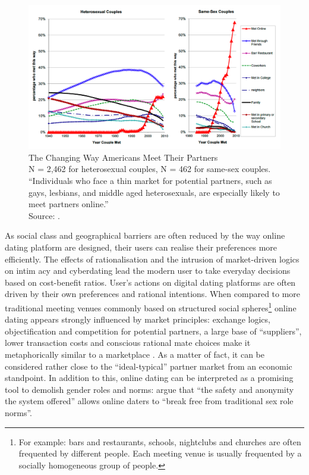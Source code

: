 \begin{figure}[h]
\includegraphics[width=1\columnwidth]{assets/rosenfeld1}

\caption{The Changing Way Americans Meet Their Partners\label{fig:The-Changing-Way}\protect \\
{\footnotesize{}N = 2,462 for heterosexual couples, N = 462 for same-sex
couples.}\protect \\
{\footnotesize{}\textquotedblleft Individuals who face a thin market
for potential partners, such as gays, lesbians, and middle aged heterosexuals,
are especially likely to meet partners online.\textquotedblright }\protect \\
{\footnotesize{}Source: \citet{Michael-J.-Rosenfeld2012Searching-for-a}.}}
\end{figure}

As social class and geographical barriers are often reduced by the
way online dating platform are designed, their users can realise their
preferences more efficiently. The effects of rationalisation and the
intrusion of market-driven logics on intim
acy and cyberdating lead
the modern user to take everyday decisions based on cost-benefit ratios.
User's actions on digital dating platforms are often driven by their
own preferences and rational intentions. When compared to more traditional
meeting venues \textendash{} commonly based on structured social spheres\footnote{For example: bars and restaurants, schools, nightclubs and churches
are often frequented by different people. Each meeting venue is usually
frequented by a socially homogeneous group of people. } \textendash{} online dating appears strongly influenced by market
principles: exchange logics, objectification and competition for potential
partners, a large base of \textquotedblleft suppliers\textquotedblright ,
lower transaction costs and conscious rational mate choices make it
metaphorically similar to a marketplace \citep{Schmitz2016The-Structure-o}.
As a matter of fact, it can be considered rather close to the \textquotedblleft ideal-typical\textquotedblright{}
partner market from an economic standpoint. In addition to this, online
dating can be interpreted as a promising tool to demolish gender roles
and norms: \citet{Scharlott1995Overcoming-Rela} argue that \textquotedblleft the
safety and anonymity the system offered\textquotedblright{} allows
online daters to \textquotedblleft break free from traditional sex
role norms\textquotedblright . 

